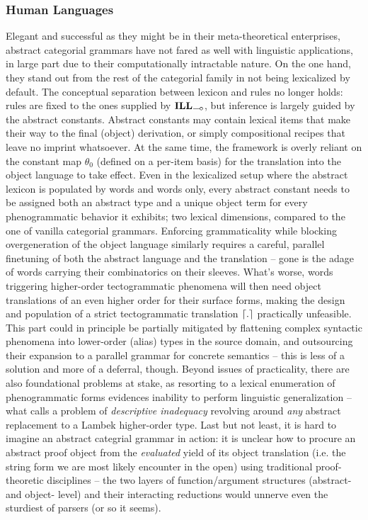 \subsubsection{Human Languages}
Elegant and successful as they might be in their meta-theoretical enterprises, abstract categorial grammars have not fared as well with linguistic applications, in large part due to their computationally intractable nature.
On the one hand, they stand out from the rest of the categorial family in not being lexicalized by default.
The conceptual separation between lexicon and rules no longer holds: rules are fixed to the ones supplied by $\ILL_{\li}$, but inference is largely guided by the abstract constants.
Abstract constants may contain lexical items that make their way to the final (object) derivation, or simply compositional recipes that leave no imprint whatsoever.
At the same time, the framework is overly reliant on the constant map $\theta_0$ (defined on a per-item basis) for the translation into the object language to take effect.
Even in the lexicalized setup where the abstract lexicon is populated by words and words only, every abstract constant needs to be assigned both an abstract type and a unique object term for every phenogrammatic behavior it exhibits; two lexical dimensions, compared to the one of vanilla categorial grammars.
Enforcing grammaticality while blocking overgeneration of the object language similarly requires a careful, parallel finetuning of both the abstract language and the translation --  gone is the adage of words carrying their combinatorics on their sleeves. 
What's worse, words triggering higher-order tectogrammatic phenomena will then need object translations of an even higher order for their surface forms, making the design and population of a strict tectogrammatic translation $\lceil{.}\rceil$ practically unfeasible.
This part could in principle be partially mitigated by flattening complex syntactic phenomena into lower-order (alias) types in the source domain, and outsourcing their expansion to a parallel grammar for concrete semantics -- this is less of a solution and more of a deferral, though.
Beyond issues of practicality, there are also foundational problems at stake, as resorting to a lexical enumeration of phenogrammatic forms evidences inability to perform linguistic generalization -- what \citet{moot2014hybrid} calls a problem of \textit{descriptive inadequacy} revolving around \textit{any} abstract replacement to a Lambek higher-order type.
Last but not least, it is hard to imagine an abstract categrial grammar in action: it is unclear how to procure an abstract proof object from the \textit{evaluated} yield of its object translation (i.e. the string form we are most likely encounter in the open) using traditional proof-theoretic disciplines -- the two layers of function/argument structures (abstract- and object- level) and their interacting reductions would unnerve even the sturdiest of parsers (or so it seems).

